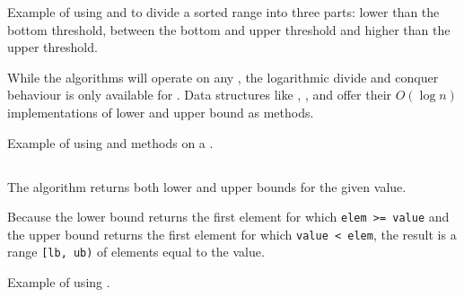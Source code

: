 \begin{codebox}[breakable]{\href{https://compiler-explorer.com/z/cbz464eWe}{\ExternalLink}}
\footnotesize Example of using  and  to divide a sorted range into three parts: lower than the bottom threshold, between the bottom and upper threshold and higher than the upper threshold.
\tcblower
{}
\end{codebox}

While the algorithms will operate on any , the logarithmic divide and conquer behaviour is only available for . Data structures like , ,  and  offer their $O(\log n)$ implementations of lower and upper bound as methods.

\begin{codebox}[]{\href{https://compiler-explorer.com/z/o9Wdvzno9}{\ExternalLink}}
\footnotesize Example of using  and  methods on a .
\tcblower
{}
\end{codebox}

\subsection{\texorpdfstring{}{\texttt{std::equal\_range}}}

The  algorithm returns both lower and upper bounds for the given value.


Because the lower bound returns the first element for which \texttt{elem >= value} and the upper bound returns the first element for which \texttt{value < elem}, the result is a range \texttt{[lb, ub)} of elements equal to the value.

\begin{codebox}[breakable]{\href{https://compiler-explorer.com/z/bhW73YG1b}{\ExternalLink}}
\footnotesize Example of using .
\tcblower
{}
\end{codebox}

\subsection{\texorpdfstring{}{\texttt{std::partition\_point}}}

